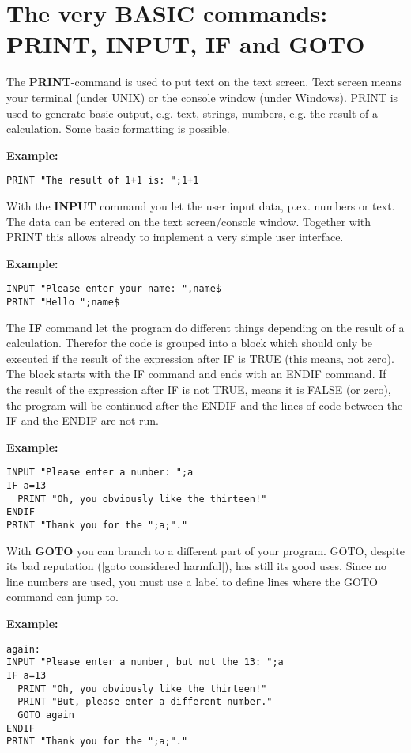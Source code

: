 \section{The very BASIC commands: PRINT, INPUT, IF and GOTO}

The {\bf PRINT}-command is used to put text on the text screen. Text screen
means your terminal (under UNIX) or the console window (under Windows). PRINT
is used to generate basic output, e.g. text, strings, numbers, e.g. the result
of a calculation. Some basic formatting is possible.
\begin{mdframed}[hidealllines=true,backgroundcolor=blue!20]
{\bf Example:}
\begin{verbatim}
PRINT "The result of 1+1 is: ";1+1
\end{verbatim}
\end{mdframed}

With the {\bf INPUT} command you let the user input data, p.ex. numbers or text.
The data can be entered on the text screen/console window. Together with 
PRINT this allows already to implement a very simple user interface. 
\begin{mdframed}[hidealllines=true,backgroundcolor=blue!20]
{\bf Example:}
\begin{verbatim}
INPUT "Please enter your name: ",name$
PRINT "Hello ";name$
\end{verbatim}
\end{mdframed}

The {\bf IF} command let the program do different things depending on the result
of a calculation. Therefor the code is grouped into a block which should only be
executed if the result of the expression after IF is TRUE (this means, not
zero). The block starts with the IF command and ends with an ENDIF command. 
If the result of the expression after IF is not TRUE, means it is FALSE 
(or zero), the program will be continued after the ENDIF and the lines of 
code between the IF and the ENDIF are not run.
\begin{mdframed}[hidealllines=true,backgroundcolor=blue!20]
{\bf Example:}
\begin{verbatim}
INPUT "Please enter a number: ";a
IF a=13
  PRINT "Oh, you obviously like the thirteen!"
ENDIF
PRINT "Thank you for the ";a;"."
\end{verbatim}
\end{mdframed}

With {\bf GOTO} you can branch to a different part of your program. 
GOTO, despite its bad reputation ([goto considered harmful]), has still its 
good uses. Since no line numbers are used, you must use a label to define 
lines where the GOTO command can jump to.
\begin{mdframed}[hidealllines=true,backgroundcolor=blue!20]
{\bf Example:}
\begin{verbatim}
again:
INPUT "Please enter a number, but not the 13: ";a
IF a=13
  PRINT "Oh, you obviously like the thirteen!"
  PRINT "But, please enter a different number."
  GOTO again
ENDIF
PRINT "Thank you for the ";a;"."
\end{verbatim}
\end{mdframed}

